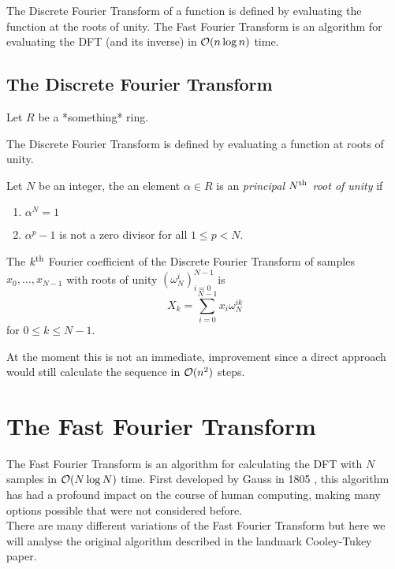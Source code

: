 The Discrete Fourier Transform of a function is defined by evaluating the function at the roots of unity. The Fast Fourier Transform is an algorithm for evaluating the DFT (and its inverse) in $\mathcal O(n \log n)$ time.

\subsection{The Discrete Fourier Transform}

Let $R$ be a *something* ring.

The Discrete Fourier Transform is defined by evaluating a function at roots of unity.

\begin{definition}
  Let $N$ be an integer, the an element $\alpha \in R$ is an \emph{principal $N^{\textrm{th}}$ root of unity} if
  \begin{enumerate}
    \item $\alpha^N = 1$
    \item $\alpha^p - 1$ is not a zero divisor for all $1 \leq p < N$.
  \end{enumerate}
\end{definition}


\begin{definition}
    The $k^{\textrm{th}}$ Fourier coefficient of the Discrete Fourier Transform of samples $x_0, \ldots, x_{N-1}$ with roots of unity $(\omega_N^i)_{i=0}^{N-1}$ is
\[
    X_k = \sum^{N-1}_{i=0}x_i\omega_{N}^{ik}
\]
for $0 \leq k \leq N-1$.
\end{definition}

At the moment this is not an immediate, improvement since a direct approach would still calculate the sequence in $\mathcal O(n^2)$ steps.


\section{The Fast Fourier Transform}

The Fast Fourier Transform is an algorithm for calculating the DFT with $N$ samples in $\mathcal O(N \log N)$ time. First developed by Gauss in 1805 \cite{gauss}, this algorithm has had a profound impact on the course of human computing, making many options possible that were not considered before.\\
There are many different variations of the Fast Fourier Transform but here we will analyse the original algorithm described in the landmark Cooley-Tukey paper\cite{10.2307/2003354}.

